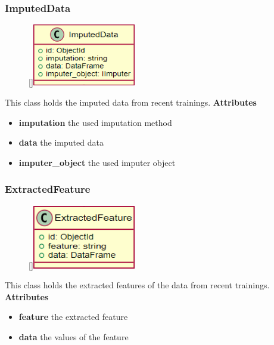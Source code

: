 \subsubsection{ImputedData}
\begin{figure}
    \raisebox{0pt}[\dimexpr{}\baselineskip\relax]{\includegraphics[width=4.5cm]{classes/model-management/16.png}}
\end{figure} 
\par
This class holds the imputed data from recent trainings.
\newline
\newline
\textbf{Attributes}
\begin{itemize}
    \item \textbf{imputation} the used imputation method
    \item \textbf{data} the imputed data
    \item \textbf{imputer\_object} the used imputer object
\end{itemize}

\subsubsection{ExtractedFeature}
\begin{figure}
    \raisebox{0pt}[\dimexpr{}\baselineskip\relax]{\includegraphics[width=4.5cm]{classes/model-management/17.png}}
\end{figure} 
\par
This class holds the extracted features of the data from recent trainings.
\newline
\newline
\textbf{Attributes}
\begin{itemize}
    \item \textbf{feature} the extracted feature
    \item \textbf{data} the values of the feature
\end{itemize}
